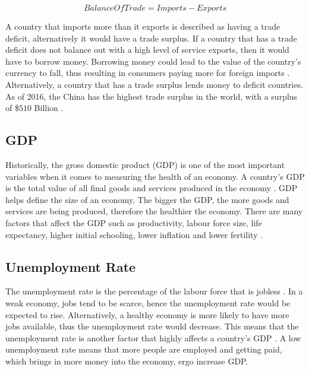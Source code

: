 \documentclass{UoYCSproject}
\begin{document}
\begin{equation}
    Balance Of Trade = Imports - Exports
\end{equation}

A country that imports more than it exports is described as having a trade deficit, alternatively it would have a trade surplus. If a country that has a trade deficit does not balance out with a high level of service exports, then it would have to borrow money. Borrowing money could lead to the value of the country's currency to fall, thus resulting in consumers paying more for foreign imports \cite{2003economics}. Alternatively, a country that has a trade surplus lends money to deficit countries. As of 2016, the China has the highest trade surplus in the world, with a surplus of \$$510$ Billion \cite{tradesurplus}.   

\subsection{GDP}
Historically, the gross domestic product (GDP) is one of the most important variables when it comes to measuring the health of an economy. A country's GDP is the total value of all final goods and services produced in the economy \cite{2003economics}. GDP helps define the size of an economy. The bigger the GDP, the more goods and services are being produced, therefore the healthier the economy.  There are many factors that affect the GDP such as productivity, labour force size, life expectancy, higher initial schooling, lower inflation and lower fertility \cite{barro1996determinants}. 

\subsection{Unemployment Rate}
The unemployment rate is the percentage of the labour force that is jobless \cite{unemployment}. In a weak economy, jobs tend to be scarce, hence the unemployment rate would be expected to rise. Alternatively, a healthy economy is more likely to have more jobs available, thus the unemployment rate would decrease. This means that the unemployment rate is another factor that highly affects a country's GDP \cite{bean1993unemployment}. A low unemployment rate means that more people are employed and getting paid, which brings in more money into the economy, ergo increase GDP.  
\end{document}
